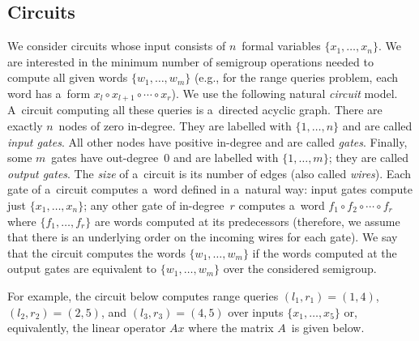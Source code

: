 \documentclass[review,onefignum,onetabnum]{siamart190516}
\begin{document}
\subsection{Circuits}\label{subsec:circuits}
We consider circuits whose input consists of $n$~formal variables
$\{x_1, \dotsc, x_n\}$. We are interested in the minimum number of semigroup
operations needed to compute all given words $\{w_1, \dotsc, w_m\}$ (e.g., for
the range queries problem, each word has a~form $x_l\circ x_{l+1}\circ \dotsb \circ x_r$). We use
the following natural {\em circuit} model. A~circuit computing all these queries
is a~directed acyclic graph. There are exactly $n$~nodes of zero in-degree. They
are labelled with $\{1, \dotsc, n\}$ and are called {\em input gates}. All
other nodes have positive in-degree and are called {\em gates}. Finally, some
$m$~gates have out-degree~0 and are labelled with $\{1, \dotsc, m\}$; they are called {\em output gates}. The
{\em size} of a~circuit is its number of edges (also called {\em wires}). Each
gate of a~circuit computes a~word defined in a~natural way: input gates compute
just $\{x_1, \dotsc, x_n\}$; any other gate of in-degree~$r$ computes a~word
$f_1 \circ f_2 \circ \dotsb \circ f_r$ where $\{f_1, \dotsc, f_r\}$ are words
computed at its predecessors (therefore, we assume that there is an underlying
order on the incoming wires for each gate). We say that the circuit computes the
words $\{w_1, \dotsc, w_m\}$ if the words computed at the output gates are
equivalent to $\{w_1, \dotsc, w_m\}$ over the considered semigroup.

For example, the circuit below computes range queries
$(l_1,r_1)=(1,4)$,
$(l_2,r_2)=(2,5)$, and
$(l_3,r_3)=(4,5)$
over inputs $\{x_1, \dotsc, x_5\}$ or, equivalently, the
linear operator $Ax$ where the matrix $A$~is given below.

\vspace{5mm}
\begin{center}
\end{center}
\vspace{5mm}
\end{document}
